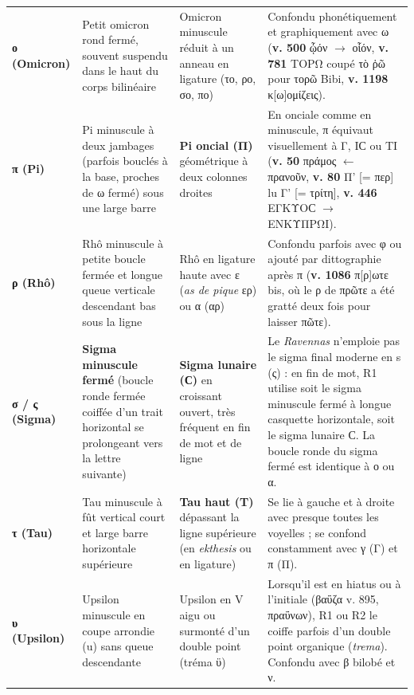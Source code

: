 \documentclass[11pt, a4paper, twoside]{article}
\renewcommand{\_}{\origunderscore\penalty0\relax}
\renewcommand{\texttt}[1]{#1}
\newcommand{\Run}{\textbf{R}\textsuperscript{1}}
\newcommand{\Rdeux}{\textbf{R}\textsuperscript{2}}
\newcommand{\Bibi}{\textit{Bibi}}
\newcommand{\inRas}[2]{[\kern-0.15em[#1]\kern-0.15em]#2}
\def\Run{R1}%
\def\Rdeux{R2}%
\def\Bibi{Bibi}%
\def\inRas#1#2{[#1]#2}%
\begin{document}
{\begin{longtable}{@{}>{\raggedright\arraybackslash}p{} >{\raggedright\arraybackslash}p{} >{\raggedright\arraybackslash}p{} >{\raggedright\arraybackslash}p{}@{}}
\addlinespace[3pt]
\textbf{ο (Omicron)} & Petit omicron rond fermé, souvent suspendu dans le haut du corps bilinéaire & Omicron minuscule réduit à un anneau en ligature (το, ρο, σο, πο) & Confondu phonétiquement et graphiquement avec ω (\textbf{v. 500} \texttt{ᾦόν} $\to$ \texttt{οἷόν}, \textbf{v. 781} \texttt{ΤΟΡΩ} coupé \texttt{τὸ ῥῶ} pour \texttt{τορῶ} \Bibi{}, \textbf{v. 1198} \texttt{κ\inRas{ω}{ο}μίζεις}). \\
\addlinespace[3pt]
\textbf{π (Pi)} & Pi minuscule à deux jambages (parfois bouclés à la base, proches de ω fermé) sous une large barre & \textbf{Pi oncial (\texttt{Π})} géométrique à deux colonnes droites & En onciale comme en minuscule, π équivaut visuellement à \texttt{Γ}, \texttt{ΙϹ} ou \texttt{ΤΙ} (\textbf{v. 50} \texttt{πράμος} $\leftarrow$ \texttt{πρανοῦν}, \textbf{v. 80} \texttt{Π'} [\texttt{= περ}] lu \texttt{Γ'} [\texttt{= τρίτη}], \textbf{v. 446} \texttt{ΕΓΚΥΟϹ} $\to$ \texttt{ΕΝΚΥΠΡΩΙ}). \\
\addlinespace[3pt]
\textbf{ρ (Rhô)} & Rhô minuscule à petite boucle fermée et longue queue verticale descendant bas sous la ligne & Rhô en ligature haute avec ε (\textit{as de pique} ερ) ou α (αρ) & Confondu parfois avec φ ou ajouté par dittographie après π (\textbf{v. 1086} \texttt{π\inRas{ρ}{}ωτε} bis, où le ρ de \texttt{πρῶτε} a été gratté deux fois pour laisser \texttt{πῶτε}). \\
\addlinespace[3pt]
\textbf{σ / ς (Sigma)} & \textbf{Sigma minuscule fermé} (boucle ronde fermée coiffée d'un trait horizontal se prolongeant vers la lettre suivante) & \textbf{Sigma lunaire (\texttt{Ϲ})} en croissant ouvert, très fréquent en fin de mot et de ligne & Le \textit{Ravennas} n'emploie pas le sigma final moderne en \texttt{s} (ς) : en fin de mot, \Run{} utilise soit le sigma minuscule fermé à longue casquette horizontale, soit le sigma lunaire \texttt{Ϲ}. La boucle ronde du sigma fermé est identique à ο ou α. \\
\addlinespace[3pt]
\textbf{τ (Tau)} & Tau minuscule à fût vertical court et large barre horizontale supérieure & \textbf{Tau haut (\texttt{Τ})} dépassant la ligne supérieure (en \textit{ekthesis} ou en ligature) & Se lie à gauche et à droite avec presque toutes les voyelles ; se confond constamment avec γ (Γ) et π (Π). \\
\addlinespace[3pt]
\textbf{υ (Upsilon)} & Upsilon minuscule en coupe arrondie (\texttt{u}) sans queue descendante & Upsilon en \texttt{V} aigu ou surmonté d'un double point (tréma ϋ) & Lorsqu'il est en hiatus ou à l'initiale (\texttt{βαΰζα} v. 895, \texttt{πραΰνων}), \Run{} ou \Rdeux{} le coiffe parfois d'un double point organique (\textit{trema}). Confondu avec β bilobé et ν. \\

\end{longtable}}
\end{document}
